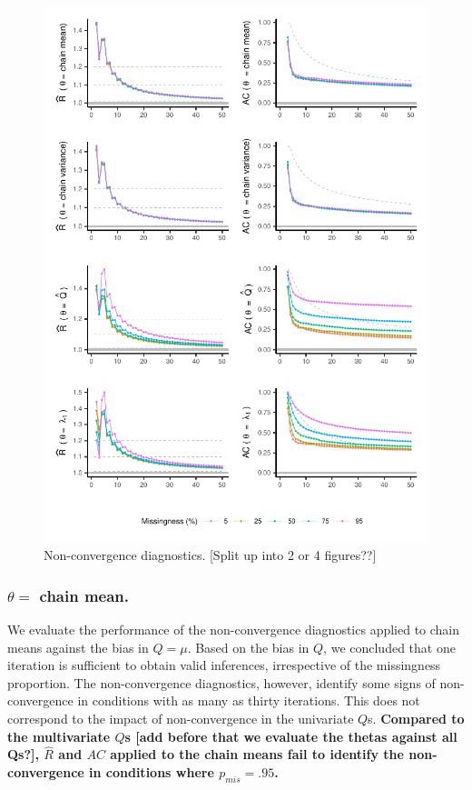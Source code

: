 \documentclass[Royal,times,sageh]{sagej}
\begin{document}
\begin{figure}

{\centering \includegraphics{2.Manuscript_files/figure-latex/rhats-acs-1} 

}

\caption{Non-convergence diagnostics. [Split up into 2 or 4 figures??]}\label{fig:rhats-acs}
\end{figure}

\hypertarget{theta-chain-mean.}{%
\subsubsection{\texorpdfstring{\(\theta=\) chain mean.}{\textbackslash theta= chain mean.}}\label{theta-chain-mean.}}

We evaluate the performance of the non-convergence diagnostics applied to chain means against the bias in \(Q=\mu\). Based on the bias in \(Q\), we concluded that one iteration is sufficient to obtain valid inferences, irrespective of the missingness proportion. The non-convergence diagnostics, however, identify some signs of non-convergence in conditions with as many as thirty iterations. This does not correspond to the impact of non-convergence in the univariate \(Q\)s. \textbf{Compared to the multivariate \(Q\)s {[}add before that we evaluate the thetas against all Qs?{]}, \(\widehat{R}\) and \(AC\) applied to the chain means fail to identify the non-convergence in conditions where \(p_{mis}=.95\).}
\end{document}
